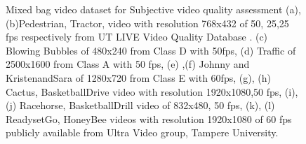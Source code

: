 \documentclass{book}
\begin{document}
\begin{figure}[bt!]
{		\label{fig:RaceHorse}}
	
	
	\caption{\label{fig:Video_Databases}
		Mixed bag video dataset for Subjective video quality assessment \cite{Kalpana}
		(a),(b)Pedestrian, Tractor, video with resolution 768x432 of 50, 25,25 fps respectively  from UT LIVE Video Quality Database .
		(c) Blowing Bubbles of 480x240 from Class D with 50fps,
		(d) Traffic of 2500x1600 from Class A with 50 fps,
		(e) ,(f) Johnny and KristenandSara of 1280x720 from Class E with 60fps, 
		(g), (h) Cactus, BasketballDrive video with resolution 1920x1080,50 fps, 
		(i), (j) Racehorse, BasketballDrill video of 832x480, 50 fps,
		(k), (l) ReadysetGo, HoneyBee videos with resolution 1920x1080 of 60 fps publicly available from Ultra Video group, Tampere University.
	}	
\end{figure}



\end{document}
